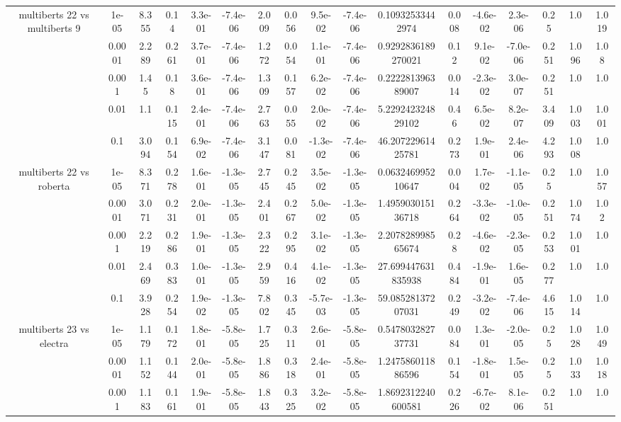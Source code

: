 \begin{tabular}{|c|c|c|c|c|c|c|c|c|c|c|c|c|c|c|c|c|}
\hline
\multirow{5}{*}{multiberts 22 vs multiberts 9} & 1e-05 & 8.355 & 0.14 & 3.3e-01 & -7.4e-06 & 2.009 & 0.056 & 9.5e-02 & -7.4e-06 & 0.10932533442974 & 0.008 & -4.6e-02 & 2.3e-06 & 0.25 & 1.0 & 1.019 \\
 & 0.0001 & 2.289 & 0.261 & 3.7e-01 & -7.4e-06 & 1.272 & 0.054 & 1.1e-01 & -7.4e-06 & 0.9292836189270021 & 0.12 & 9.1e-02 & -7.0e-06 & 0.251 & 1.096 & 1.08 \\
 & 0.001 & 1.45 & 0.18 & 3.6e-01 & -7.4e-06 & 1.309 & 0.157 & 6.2e-02 & -7.4e-06 & 0.222281396389007 & 0.014 & -2.3e-02 & 3.0e-07 & 0.251 & 1.0 & 1.0 \\
 & 0.01 & 1.1 & 0.115 & 2.4e-01 & -7.4e-06 & 2.763 & 0.055 & 2.0e-02 & -7.4e-06 & 5.229242324829102 & 0.46 & 6.5e-02 & 8.2e-07 & 3.409 & 1.003 & 1.001 \\
 & 0.1 & 3.094 & 0.154 & 6.9e-02 & -7.4e-06 & 3.147 & 0.081 & -1.3e-02 & -7.4e-06 & 46.20722961425781 & 0.273 & 1.9e-01 & 2.4e-06 & 4.293 & 1.008 & 1.0 \\
\hline
\multirow{5}{*}{multiberts 22 vs roberta } & 1e-05 & 8.371 & 0.278 & 1.6e-01 & -1.3e-05 & 2.745 & 0.245 & 3.5e-02 & -1.3e-05 & 0.063246995210647 & 0.004 & 1.7e-02 & -1.1e-05 & 0.25 & 1.0 & 1.057 \\
 & 0.0001 & 3.071 & 0.231 & 2.0e-01 & -1.3e-05 & 2.401 & 0.267 & 5.0e-02 & -1.3e-05 & 1.495903015136718 & 0.264 & -3.3e-02 & -1.0e-05 & 0.251 & 1.074 & 1.02 \\
 & 0.001 & 2.219 & 0.286 & 1.9e-01 & -1.3e-05 & 2.322 & 0.295 & 3.1e-02 & -1.3e-05 & 2.207828998565674 & 0.28 & -4.6e-02 & -2.3e-05 & 0.253 & 1.001 & 1.0 \\
 & 0.01 & 2.469 & 0.383 & 1.0e-01 & -1.3e-05 & 2.959 & 0.416 & 4.1e-02 & -1.3e-05 & 27.699447631835938 & 0.484 & -1.9e-01 & 1.6e-05 & 0.277 & 1.0 & 1.0 \\
 & 0.1 & 3.928 & 0.254 & 1.9e-02 & -1.3e-05 & 7.802 & 0.345 & -5.7e-03 & -1.3e-05 & 59.08528137207031 & 0.249 & -3.2e-02 & -7.4e-06 & 4.615 & 1.014 & 1.0 \\
\hline
\multirow{5}{*}{multiberts 23 vs electra } & 1e-05 & 1.179 & 0.172 & 1.8e-01 & -5.8e-05 & 1.725 & 0.311 & 2.6e-01 & -5.8e-05 & 0.547803282737731 & 0.084 & 1.3e-01 & -2.0e-05 & 0.25 & 1.028 & 1.049 \\
 & 0.0001 & 1.152 & 0.144 & 2.0e-01 & -5.8e-05 & 1.886 & 0.318 & 2.4e-01 & -5.8e-05 & 1.247586011886596 & 0.154 & -1.8e-01 & 1.5e-05 & 0.25 & 1.033 & 1.018 \\
 & 0.001 & 1.183 & 0.161 & 1.9e-01 & -5.8e-05 & 1.843 & 0.325 & 3.2e-02 & -5.8e-05 & 1.8692312240600581 & 0.226 & -6.7e-02 & 8.1e-06 & 0.251 & 1.0 & 1.0 \\

\end{tabular}
